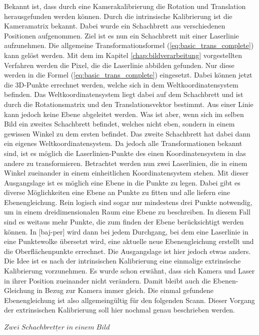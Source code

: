 		Bekannt ist, dass durch eine Kamerakalibrierung die Rotation und Translation herausgefunden werden können. Durch die intrinsische Kalibrierung ist die Kameramatrix bekannt. Dabei wurde ein Schachbrett aus verschiedenen Positionen aufgenommen. Ziel ist es nun ein Schachbrett mit einer Laserlinie aufzunehmen. Die allgemeine Transformationsformel (\ref{eq:basic_trans_complete}) kann gelöst werden. Mit dem im Kapitel \ref{chap:bildverarbeitung} vorgestellten Verfahren werden die Pixel, die die Laserlinie abbilden gefunden. Nur diese werden in die Formel (\ref{eq:basic_trans_complete}) eingesetzt. Dabei können jetzt die 3D-Punkte errechnet werden, welche sich in dem Weltkoordinatensystem befinden. Das Weltkoordinatensystem liegt dabei auf dem Schachbrett und ist durch die Rotationsmatrix und den Translationsvektor bestimmt. Aus einer Linie kann jedoch keine Ebene abgeleitet werden. Was ist aber, wenn sich im selben Bild ein zweites Schachbrett befindet, welches nicht eben, sondern in einem gewissen Winkel zu dem ersten befindet. Das zweite Schachbrett hat dabei dann ein eigenes Weltkoordinatensystem. Da jedoch alle Transformationen bekannt sind, ist es möglich die Laserlinien-Punkte des einen Koordinatensystem in das andere zu transformieren. Betrachtet werden nun zwei Laserlinien, die in einem Winkel zueinander in einem einheitlichen Koordinatensystem stehen. Mit dieser Ausgangslage ist es möglich eine Ebene in die Punkte zu legen. Dabei gibt es diverse Möglichkeiten eine Ebene an Punkte zu fitten und alle liefern eine Ebenengleichung. Rein logisch sind sogar nur mindestens drei Punkte notwendig, um in einem dreidimensionalen Raum eine Ebene zu beschreiben. In diesem Fall sind es weitaus mehr Punkte, die zum finden der Ebene berücksichtigt werden können. \newline
		In [baj-per] wird dann bei jedem Durchgang, bei dem eine Laserlinie in eine Punktewolke übersetzt wird, eine aktuelle neue Ebenengleichung erstellt und die Oberflächenpunkte errechnet. Die Ausgangslage ist hier jedoch etwas anders. Die Idee ist es nach der intrinsischen Kalibrierung eine einmalige extrinsische Kalibrierung vorzunehmen. Es wurde schon erwähnt, dass sich Kamera und Laser in ihrer Position zueinander nicht verändern. Damit bleibt auch die Ebenen-Gleichung in Bezug zur Kamera immer gleich. Die einmal  gefundene Ebenengleichung ist also allgemeingültig für den folgenden Scann. Dieser Vorgang der extrinsischen Kalibrierung soll hier nochmal genau beschrieben werden.
		
		$\underline{Zwei \; Schachbretter \; in \; einem \; Bild}$
		
